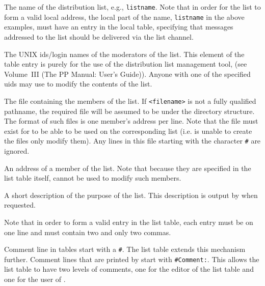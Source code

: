 \begin{describe}

\item[\verb+listname+:] 
The name of the distribution list, e.g., \verb+listname+.
Note that in order for the list to form
a valid local address, the local part of the name, \verb+listname+ in
the above examples, must have an entry in the local 
table, specifying that messages addressed to the list should be
delivered via the list channel.

\item[\verb+moderator+:]
 The UNIX ids/login names of the moderators of the list.  This element
of the table entry is purely for the use of the distribution list
management tool,  (see Volume~III (The PP Manual: 
User's Guide)).  Anyone with one of the specified uids
may use  to modify the contents of the list.

\item[\verb+file+:]
The file containing the members of the list.  If \verb+<filename>+ is
not a fully qualified pathname, the required file will be assumed to
be under the  directory structure.  The format of such
files is one member's address per line.
Note that the file must exist for  to be able to be used on
the corresponding list (i.e.  is unable to create the files
only modify them).
Any lines in this file starting with the character \verb+#+ are ignored.

\item[\verb+mail address+:] An address of a member of the list.
Note that because they are specified in the list table itself,
 cannot be used to modify such members.

\item[\verb+description+:] A short description of the purpose of the list.
This description is output by  when requested.
\end{describe}

Note that in order to form a valid entry in the list table, each entry
must be on one line and must contain two and only two commas.

Comment line in tables start with a \verb+#+.
The list table extends this mechanism further.
Comment lines that are printed by  start with \verb+#Comment:+.
This allows the list table to have two levels of comments,
one for the editor of the list table and one for the user of .


